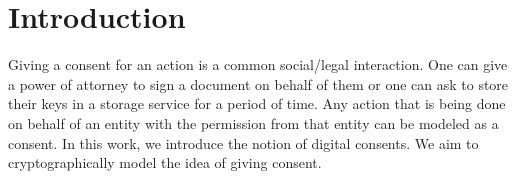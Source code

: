 \section{Introduction}

Giving a consent for an action is a common social/legal interaction. One can give a power of attorney to sign a document on behalf of them or one can ask to store their keys in a storage service for a period of time. Any action that is being done on behalf of an entity with the permission from that entity can be modeled as a consent. In this work, we introduce the notion of digital consents. We aim to cryptographically model the idea of giving consent.

